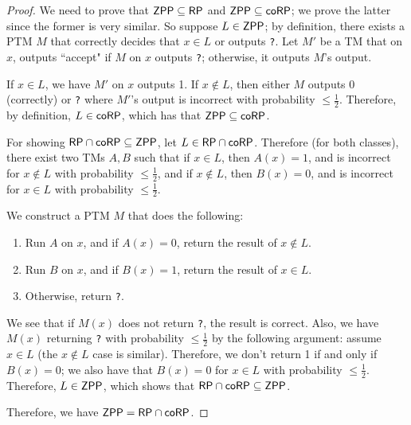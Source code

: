 \begin{proof}
We need to prove that ${\mathsf{ZPP}} \subseteq {\ensuremath{\mathsf{RP}}}$ and ${\mathsf{ZPP}} \subseteq {\ensuremath{\mathsf{coRP}}}$; we prove the latter since the former is very similar. So suppose $L \in {\ensuremath{\mathsf{ZPP}}}$; by definition, there exists a PTM $M$ that correctly decides that $x \in L$ or outputs \texttt{?}. Let $M'$ be a TM that on $x$, outputs ``accept" if $M$ on $x$ outputs \texttt{?}; otherwise, it outputs $M$'s output.

\par If $x \in L$, we have $M'$ on $x$ outputs 1. If $x \notin L$, then either $M$ outputs 0 (correctly) or \texttt{?} where $M'$'s output is incorrect with probability $\le \frac{1}{2}$. Therefore, by definition, $L \in {\ensuremath{\mathsf{coRP}}}$, which has that ${\mathsf{ZPP}} \subseteq {\ensuremath{\mathsf{coRP}}}$.

\par For showing ${\mathsf{RP}} \cap {\ensuremath{\mathsf{coRP}}} \subseteq {\ensuremath{\mathsf{ZPP}}}$, let $L \in {\ensuremath{\mathsf{RP}}} \cap {\ensuremath{\mathsf{coRP}}}$. Therefore (for both classes), there exist two TMs $A, B$ such that if $x \in L$, then $A(x) = 1$, and is incorrect for $x \notin L$ with probability $\le \frac{1}{2}$, and if $x \notin L$, then $B(x) = 0$, and is incorrect for $x \in L$ with probability $\le \frac{1}{2}$. 

\par We construct a PTM $M$ that does the following:
\begin{enumerate}
\item Run $A$ on $x$, and if $A(x) = 0$, return the result of $x \notin L$.
\item Run $B$ on $x$, and if $B(x) = 1$, return the result of $x \in L$. 
\item Otherwise, return \texttt{?}.
\end{enumerate}
We see that if $M(x)$ does not return \texttt{?}, the result is correct. Also, we have $M(x)$ returning \texttt{?} with probability $\le \frac{1}{2}$ by the following argument: assume $x \in L$ (the $x \notin L$ case is similar). Therefore, we don't return 1 if and only if $B(x) = 0$; we also have that $B(x) = 0$ for $x \in L$ with probability $\le \frac{1}{2}$. Therefore, $L \in {\ensuremath{\mathsf{ZPP}}}$, which shows that ${\mathsf{RP}} \cap {\ensuremath{\mathsf{coRP}}} \subseteq {\ensuremath{\mathsf{ZPP}}}$.

\par Therefore, we have ${\mathsf{ZPP}} = {\mathsf{RP}} \cap {\ensuremath{\mathsf{coRP}}}$.  
\end{proof}

